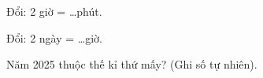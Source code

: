 \begin{ex}
Đổi: 2 giờ = \dots phút.
\end{ex}

\begin{ex}
Đổi: 2 ngày = \dots giờ.
\end{ex}

\begin{ex}
Năm 2025 thuộc thế kỉ thứ mấy? (Ghi số tự nhiên).
\end{ex}
